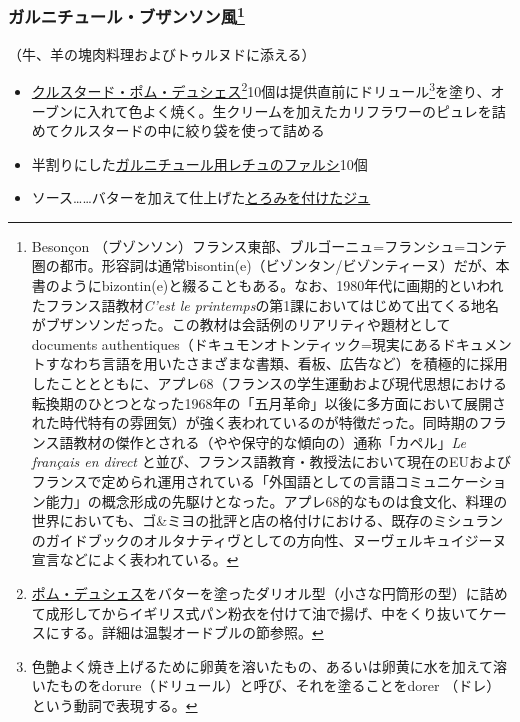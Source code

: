 \begin{recette}
\hypertarget{garniture-bezontinne}{%
\subsubsection[ガルニチュール・ブザンソン風]{\texorpdfstring{ガルニチュール・ブザンソン風\footnote{Besonçon
  （ブゾンソン）フランス東部、ブルゴーニュ=フランシュ=コンテ圏の都市。形容詞は通常bisontin(e)（ビゾンタン/ビゾンティーヌ）だが、本書のようにbizontin(e)と綴ることもある。なお、1980年代に画期的といわれたフランス語教材\emph{C'est
  le
  printemps}の第1課においてはじめて出てくる地名がブザンソンだった。この教材は会話例のリアリティや題材としてdocuments
  authentiques（ドキュモンオトンティック=現実にあるドキュメントすなわち言語を用いたさまざまな書類、看板、広告など）を積極的に採用したこととともに、アプレ68（フランスの学生運動および現代思想における転換期のひとつとなった1968年の「五月革命」以後に多方面において展開された時代特有の雰囲気）が強く表われているのが特徴だった。同時期のフランス語教材の傑作とされる（やや保守的な傾向の）通称「カペル」\emph{Le
  français en direct}
  と並び、フランス語教育・教授法において現在のEUおよびフランスで定められ運用されている「外国語としての言語コミュニケーション能力」の概念形成の先駆けとなった。アプレ68的なものは食文化、料理の世界においても、ゴ\&ミヨの批評と店の格付けにおける、既存のミシュランのガイドブックのオルタナティヴとしての方向性、ヌーヴェルキュイジーヌ宣言などによく表われている。}}{ガルニチュール・ブザンソン風}}\label{garniture-bezontinne}}



（牛、羊の塊肉料理およびトゥルヌドに添える）

\begin{itemize}
\item
  \protect\hyperlink{croustade-en-pomme-duchesse}{クルスタード・ポム・デュシェス}\footnote{\protect\hyperlink{pomme-de-terre-duchesse}{ポム・デュシェス}をバターを塗ったダリオル型（小さな円筒形の型）に詰めて成形してからイギリス式パン粉衣を付けて油で揚げ、中をくり抜いてケースにする。詳細は温製オードブルの節参照。}10個は提供直前にドリュール\footnote{色艶よく焼き上げるために卵黄を溶いたもの、あるいは卵黄に水を加えて溶いたものをdorure（ドリュール）と呼び、それを塗ることをdorer
    （ドレ）という動詞で表現する。}を塗り、オーブンに入れて色よく焼く。生クリームを加えたカリフラワーのピュレを詰めてクルスタードの中に絞り袋を使って詰める
\item
  半割りにした\protect\hyperlink{laitues-farcies-pour-garniture}{ガルニチュール用レチュのファルシ}10個
\item
  ソース\ldots{}\ldots{}バターを加えて仕上げた\protect\hyperlink{jus-de-veau-lie}{とろみを付けたジュ}
\end{itemize}


\end{recette}
